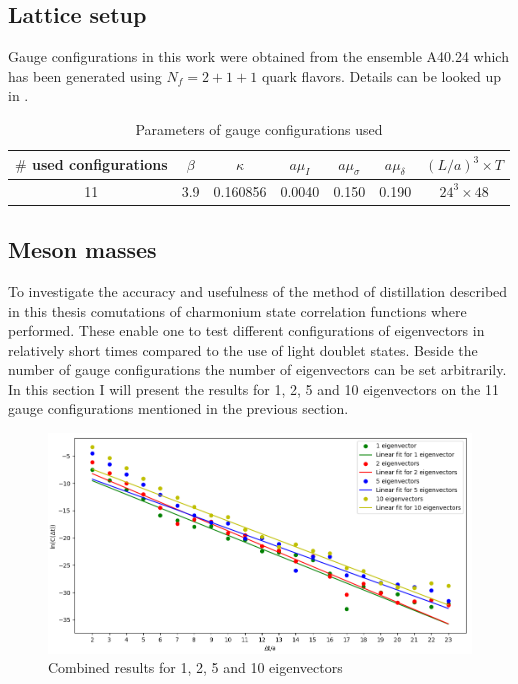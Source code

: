 

\subsection{Lattice setup}
    Gauge configurations in this work were obtained from the ensemble A40.24 which has been generated using $N_f = 2 + 1 + 1$ quark flavors. Details can be looked up in \cite{guage_configurations}. 
    
    \begin{table}[h]
        \centering
        \begin{tabular}{lllllll}
        \hline
        \multicolumn{1}{|c|}{$\#$ used configurations} & \multicolumn{1}{c|}{$\beta$} & \multicolumn{1}{c|}{$\kappa$} & \multicolumn{1}{c|}{$a\mu_I$} & \multicolumn{1}{c|}{$a\mu_\sigma$} & \multicolumn{1}{c|}{$a\mu_\delta$} & \multicolumn{1}{c|}{$(L/a)^3 \times T$} \\ \hline
        \multicolumn{1}{|c|}{11} & \multicolumn{1}{c|}{3.9} & \multicolumn{1}{c|}{0.160856} & \multicolumn{1}{c|}{0.0040} & \multicolumn{1}{c|}{0.150} & \multicolumn{1}{c|}{0.190} & \multicolumn{1}{c|}{$24^3 \times 48$} \\ \hline
        \end{tabular}
        \caption{Parameters of gauge configurations used}
        \label{table_gauge_params}
    \end{table}

    
\subsection{Meson masses}
    To investigate the accuracy and usefulness of the method of distillation described in this thesis comutations of charmonium state correlation functions where performed. These enable one to test different configurations of eigenvectors in relatively short times compared to the use of light doublet states. Beside the number of gauge configurations the number of eigenvectors can be set arbitrarily. In this section I will present the results for 1, 2, 5 and 10 eigenvectors on the 11 gauge configurations mentioned in the previous section.\\
    
    \begin{figure}[H]
        \centering
        \includegraphics[width=1\textwidth]{images/1_2_5_10_evs_log.png}
        \caption{Combined results for 1, 2, 5 and 10 eigenvectors}
        \label{1_2_5_10_evs_log}
    \end{figure}
    
